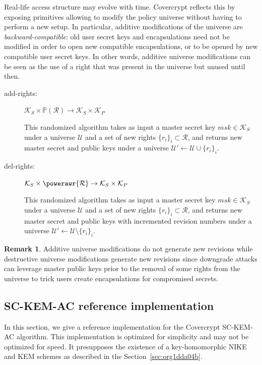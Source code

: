 \documentclass[a4paper]{article}
\theoremstyle{definition}
\newtheorem*{remark}{Remark}
\newcommand{\powerset}[1]{\mathbb P(#1)}
\newcommand{\cK}{\mathcal{K}}
\newcommand{\cR}{\mathcal{R}}
\newcommand{\cU}{\mathcal{U}}
\begin{document}
Real-life access  structure may evolve  with time.  Covercrypt reflects  this by
exposing primitives  allowing to  modify the policy  universe without  having to
perform a new  setup. In particular, additive modifications of  the universe are
\emph{backward-compatible}:  old user  secret  keys and  encapsulations  need not  be
modified in order to open new compatible  encapsulations, or to be opened by new
compatible user secret keys. In other words, additive universe modifications can
be seen as the use of a right  that was present in the universe but unused until
then.
\begin{description}
\item[{add-rights:}] \(\cK_S \times \powerset{\cR} \rightarrow \cK_S \times \cK_P\)

This randomized algorithm  takes as input a master secret  key \(msk \in \cK_S\)
under a universe  \(\cU\) and a set  of new rights \(\{r_i\}_i  \subset \cR\), and
returns new  master secret and  public keys under  a universe \(\cU'  \gets \cU
  \cup \{r_i\}_i\).

\item[{del-rights:}] \(\cK_S \times \powerawr{\cR} \rightarrow \cK_S \times \cK_P\)

This randomized algorithm  takes as input a master secret  key \(msk \in \cK_S\)
under a universe  \(\cU\) and a set  of new rights \(\{r_i\}_i  \subset \cR\), and
returns new  master secret and  public keys with incremented  revision numbers
under a universe \(\cU' \gets \cU \setminus \{r_i\}_i\).
\end{description}

\begin{remark}
Additive universe modifications do not  generate new revisions while destructive
universe  modifications  generate  new  revisions since  downgrade  attacks  can
leverage  master public  keys  prior to  the  removal of  some  rights from  the
universe to trick users create encapsulations for compromised secrets.
\end{remark}
\subsection{SC-KEM-AC reference implementation}
\label{sec:orgc79a45f}

In this section, we give a reference implementation for the Covercrypt SC-KEM-AC
algorithm.   This implementation  is optimized  for  simplicity and  may not  be
optimized for speed. It presupposes the  existence of a key-homomorphic NIKE and
KEM schemes as described in the Section \ref{sec:org1dda04b}.
\end{document}
